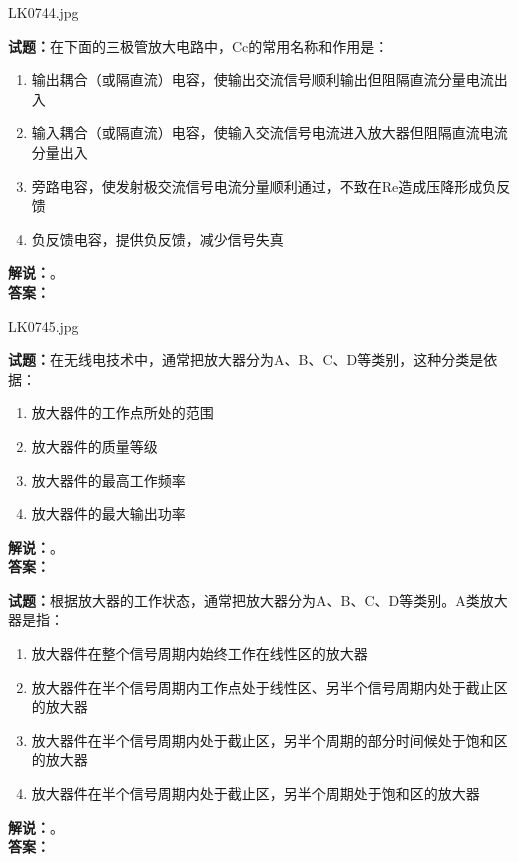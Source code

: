 \documentclass{ctexbook}
\begin{document}
\bigskip

LK0744.jpg


\noindent\textbf{试题：}在下面的三极管放大电路中，Cc的常用名称和作用是：
\begin{enumerate}[leftmargin=3em]
\item 输出耦合（或隔直流）电容，使输出交流信号顺利输出但阻隔直流分量电流出入
\item 输入耦合（或隔直流）电容，使输入交流信号电流进入放大器但阻隔直流电流分量出入
\item 旁路电容，使发射极交流信号电流分量顺利通过，不致在Re造成压降形成负反馈
\item 负反馈电容，提供负反馈，减少信号失真
\end{enumerate}
\noindent\textbf{解说：}\textbf{}。\\\noindent\textbf{答案：}

\bigskip

LK0745.jpg


\noindent\textbf{试题：}在无线电技术中，通常把放大器分为A、B、C、D等类别，这种分类是依据：
\begin{enumerate}[leftmargin=3em]
\item 放大器件的工作点所处的范围
\item 放大器件的质量等级
\item 放大器件的最高工作频率
\item 放大器件的最大输出功率
\end{enumerate}
\noindent\textbf{解说：}\textbf{}。\\\noindent\textbf{答案：}

\bigskip




\noindent\textbf{试题：}根据放大器的工作状态，通常把放大器分为A、B、C、D等类别。A类放大器是指：
\begin{enumerate}[leftmargin=3em]
\item 放大器件在整个信号周期内始终工作在线性区的放大器
\item 放大器件在半个信号周期内工作点处于线性区、另半个信号周期内处于截止区的放大器
\item 放大器件在半个信号周期内处于截止区，另半个周期的部分时间候处于饱和区的放大器
\item 放大器件在半个信号周期内处于截止区，另半个周期处于饱和区的放大器
\end{enumerate}
\noindent\textbf{解说：}\textbf{}。\\\noindent\textbf{答案：}

\bigskip
\end{document}
